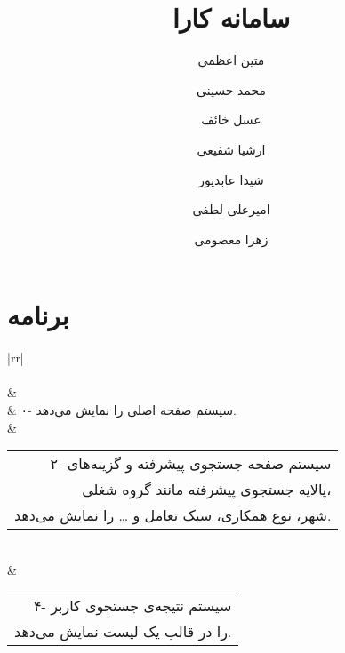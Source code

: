 \documentclass[12pt]{article}
\author{متین اعظمی}
\author{محمد حسینی}
\author{عسل خائف}
\author{ارشیا شفیعی}
\author{شیدا عابدپور}
\author{امیرعلی لطفی}
\author{زهرا معصومی}
\title{سامانه کارا}
\begin{document}
	
	\section{برنامه}
	\begin{table}[]
		\begin{tabular}{|rr|}
			\hline
			                                                                                                                                                                                                                                           \\ \hline
			                                                                                                                                                                                                                                                                             \\ \hline
			                                                                                           &                                                                                                                               \\ \hline
			                                                                                                       & ۰- سیستم صفحه اصلی را نمایش می‌دهد.                                                                                                                                           \\ \hline
			  & \begin{tabular}[c]{@{}r@{}}۲- سیستم صفحه جستجوی پیشرفته و گزینه‌های\\  پالایه جستجوی پیشرفته مانند گروه شغلی،\\  شهر، نوع همکاری، سبک تعامل و … را نمایش می‌دهد.\end{tabular} \\ \hline
			 & \begin{tabular}[c]{@{}r@{}}۴- سیستم نتیجه‌ی جستجوی کاربر\\  را در قالب یک لیست نمایش می‌دهد.\end{tabular}                                                                     \\ \hline

\end{tabular}
\end{table}
\end{document}
